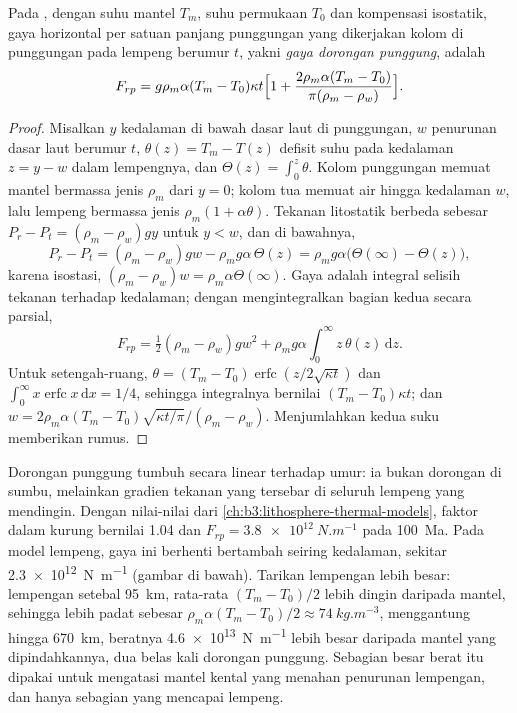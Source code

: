 \begin{proposition}\label{prop:b3:mantle-convection:ridge-push}
Pada , dengan suhu mantel $T_m$, suhu permukaan
$T_0$ dan kompensasi isostatik, gaya horizontal per satuan
panjang punggungan yang dikerjakan kolom di punggungan pada lempeng berumur $t$,
yakni \emph{gaya dorongan punggung}, adalah
\[
  F_{rp} = g\rho_m\alpha(T_m - T_0)\kappa t\Bigl[1 + \frac{2\rho_m\alpha(T_m
  - T_0)}{\pi(\rho_m - \rho_w)}\Bigr].
\]
\end{proposition}

\begin{proof}
Misalkan $y$ kedalaman di bawah dasar laut di punggungan, $w$ penurunan
dasar laut berumur $t$, $\theta(z) = T_m - T(z)$ defisit suhu pada
kedalaman $z = y - w$ dalam lempengnya, dan $\Theta(z) = \int_0^z\theta$. Kolom punggungan
memuat mantel bermassa jenis $\rho_m$ dari $y = 0$; kolom tua memuat
air hingga kedalaman $w$, lalu lempeng bermassa jenis $\rho_m(1 + \alpha\theta)$. Tekanan
litostatik berbeda sebesar $P_r - P_t = (\rho_m - \rho_w)gy$ untuk $y < w$,
dan di bawahnya,
\[
  P_r - P_t = (\rho_m - \rho_w)gw - \rho_mg\alpha\,\Theta(z)
  = \rho_mg\alpha\bigl(\Theta(\infty) - \Theta(z)\bigr),
\]
karena isostasi, $(\rho_m - \rho_w)w = \rho_m\alpha\Theta(\infty)$. Gaya adalah
integral selisih tekanan terhadap kedalaman; dengan mengintegralkan bagian kedua
secara parsial,
\[
  F_{rp} = \tfrac12(\rho_m - \rho_w)gw^2 + \rho_mg\alpha\int_0^\infty
  z\,\theta(z)\,\mathrm dz .
\]
Untuk setengah-ruang, $\theta = (T_m - T_0)\operatorname{erfc}(z/2\sqrt{\kappa
t})$ dan $\int_0^\infty x\operatorname{erfc}x\,\mathrm dx = 1/4$, sehingga
integralnya bernilai $(T_m - T_0)\kappa t$; dan $w = 2\rho_m\alpha(T_m -
T_0)\sqrt{\kappa t/\pi}/(\rho_m - \rho_w)$. Menjumlahkan kedua suku memberikan
rumus.
\end{proof}

Dorongan punggung tumbuh secara linear terhadap umur: ia bukan dorongan di sumbu, melainkan
gradien tekanan yang tersebar di seluruh lempeng yang mendingin. Dengan nilai-nilai dari
\cref{ch:b3:lithosphere-thermal-models}, faktor dalam kurung bernilai 1.04 dan $F_{rp} =
\qty{3.8e12}{N.m^{-1}}$ pada \qty{100}{Ma}. Pada model lempeng, gaya ini berhenti
bertambah seiring kedalaman, sekitar \qty{2.3e12}{N.m^{-1}} (gambar di bawah). Tarikan lempengan
lebih besar: lempengan setebal \qty{95}{km}, rata-rata $(T_m - T_0)/2$ lebih dingin daripada
mantel, sehingga lebih padat sebesar $\rho_m\alpha(T_m - T_0)/2 \approx
\qty{74}{kg.m^{-3}}$, menggantung hingga \qty{670}{km}, beratnya
\qty{4.6e13}{N.m^{-1}} lebih besar daripada mantel yang dipindahkannya, dua belas kali
dorongan punggung. Sebagian besar berat itu dipakai untuk mengatasi mantel kental yang menahan
penurunan lempengan, dan hanya sebagian yang mencapai lempeng.


